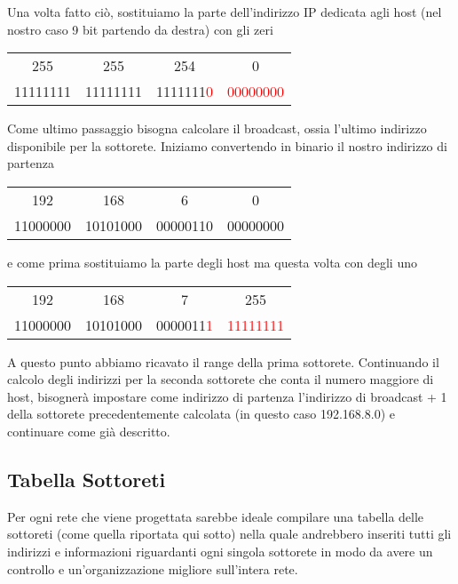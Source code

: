 Una volta fatto ciò, sostituiamo la parte dell'indirizzo IP dedicata agli host (nel nostro caso 9 bit partendo da destra) con gli zeri

\begin{center}
    \begin{tabular}{c@{.}c@{.}c@{.}c}
        255 & 255 & 254 & 0\\
        11111111 & 11111111 & 1111111\textcolor{red}{0} & \textcolor{red}{00000000}
    \end{tabular}
\end{center}

Come ultimo passaggio bisogna calcolare il broadcast, ossia l'ultimo indirizzo disponibile per la sottorete. Iniziamo convertendo in binario il nostro indirizzo di partenza

\begin{center}
    \begin{tabular}{c@{.}c@{.}c@{.}c}
        192 & 168 & 6 & 0\\
        11000000 & 10101000 & 00000110 & 00000000
    \end{tabular}
\end{center}

\noindent e come prima sostituiamo la parte degli host ma questa volta con degli uno

\begin{center}
    \begin{tabular}{c@{.}c@{.}c@{.}c}
        192 & 168 & 7 & 255\\
        11000000 & 10101000 & 0000011\textcolor{red}{1} & \textcolor{red}{11111111}
    \end{tabular}
\end{center}

A questo punto abbiamo ricavato il range della prima sottorete. Continuando il calcolo degli indirizzi per la seconda sottorete che conta il numero maggiore di host, bisognerà impostare come indirizzo di partenza l'indirizzo di broadcast + 1 della sottorete precedentemente calcolata (in questo caso 192.168.8.0) e continuare come già descritto.

\subsection{Tabella Sottoreti}
Per ogni rete che viene progettata sarebbe ideale compilare una tabella delle sottoreti (come quella riportata qui sotto) nella quale andrebbero inseriti tutti gli indirizzi e informazioni riguardanti ogni singola sottorete in modo da avere un controllo e un'organizzazione migliore sull'intera rete.

